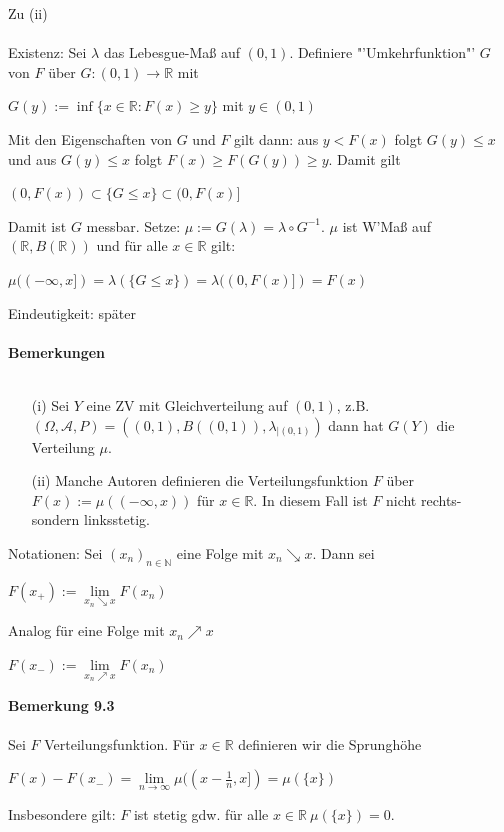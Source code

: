\documentclass[10pt,a4paper]{report}
\newcommand{\N}{\mathbb{N}}
\newcommand{\R}{\mathbb{R}}
\numberwithin{equation}{section}
\numberwithin{figure}{section}
\theoremstyle{plain}
\theoremstyle{definition}
\theoremstyle{plain}
\theoremstyle{definition}
\theoremstyle{remark}
\theoremstyle{plain}
\theoremstyle{plain}
\theoremstyle{plain}
\newcommand{\1}{ \mathbb{1} } %
\begin{document}
Zu (ii)\\\\
Existenz: Sei $\lambda$ das Lebesgue-Maß auf $(0,1)$. Definiere "'Umkehrfunktion"' $G$ von $F$ über $G:(0,1) \to \R$ mit
\begin{center}
$G(y):=\inf\{x \in \R:F(x)\geq y\}$ mit $y \in (0,1)$
\end{center}
Mit den Eigenschaften von $G$ und $F$ gilt dann: aus $y<F(x)$ folgt $G(y)\leq x$ und aus $G(y)\leq x$ folgt $F(x)\geq F(G(y))\geq y$. Damit gilt
\begin{center}
$(0,F(x)) \subset \{G\leq x\}\subset (0,F(x)]$
\end{center}
Damit ist $G$ messbar. Setze: $\mu:=G(\lambda)=\lambda\circ G^{-1}$. $\mu$ ist W'Maß auf $(\R,B(\R))$ und für alle $x \in \R$ gilt:
\begin{center}
$\mu((-\infty,x])=\lambda(\{G\leq x\})=\lambda((0,F(x)])=F(x)$
\end{center} 
Eindeutigkeit: später\\\\
\textbf{Bemerkungen}\\\\
\begin{itemize}
\item[(i)] Sei $Y$ eine ZV mit Gleichverteilung auf $(0,1)$, z.B. $(\Omega,\mathcal{A},P)=((0,1),B((0,1)),\lambda_{|(0,1)})$ dann hat $G(Y)$ die Verteilung $\mu$.
\item[(ii)] Manche Autoren definieren die Verteilungsfunktion $F$ über $F(x):=\mu((-\infty,x))$ für $x \in \R$. In diesem Fall ist $F$ nicht rechts- sondern linksstetig.
\end{itemize}
Notationen: Sei $(x_n)_{n \in \N}$ eine Folge mit $x_n\searrow x$. Dann sei
\begin{center}
$F(x_+):=\lim\limits_{x_n\searrow x} F(x_n)$
\end{center} 
Analog für eine Folge mit $x_n\nearrow x$
\begin{center}
$F(x_-):=\lim\limits_{x_n\nearrow x} F(x_n)$
\end{center}
\textbf{Bemerkung 9.3}\\\\
Sei $F$ Verteilungsfunktion. Für $x \in \R$ definieren wir die Sprunghöhe
\begin{center}
$F(x)-F(x_-)=\lim\limits_{n \to \infty} \mu((x-\frac{1}{n},x])=\mu(\{x\})$
\end{center}
Insbesondere gilt: $F$ ist stetig gdw. für alle $x \in \R ~ \mu(\{x\})=0$.\\\\
\end{document}
